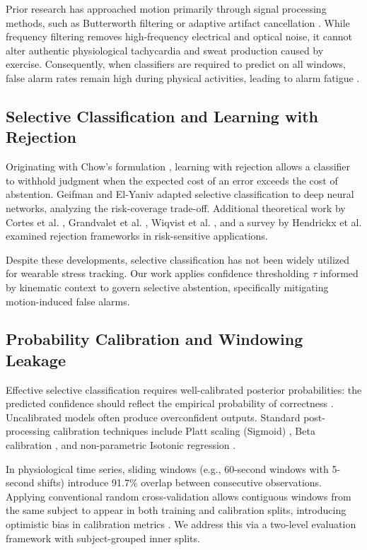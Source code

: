 \documentclass[conference]{IEEEtran}
\begin{document}
Prior research has approached motion primarily through signal processing methods, such as Butterworth filtering or adaptive artifact cancellation \cite{zhang2014troika}. While frequency filtering removes high-frequency electrical and optical noise, it cannot alter authentic physiological tachycardia and sweat production caused by exercise. Consequently, when classifiers are required to predict on all windows, false alarm rates remain high during physical activities, leading to alarm fatigue \cite{can2019stress}.

\subsection{Selective Classification and Learning with Rejection}
Originating with Chow's formulation \cite{chow1970optimum}, learning with rejection allows a classifier to withhold judgment when the expected cost of an error exceeds the cost of abstention. Geifman and El-Yaniv \cite{geifman2017selective, geifman2019selectivenet} adapted selective classification to deep neural networks, analyzing the risk-coverage trade-off. Additional theoretical work by Cortes et al. \cite{cortes2016learning}, Grandvalet et al. \cite{grandvalet2002adaptive}, Wiqvist et al. \cite{wiqvist2022partially}, and a survey by Hendrickx et al. \cite{hendrickx2021machine} examined rejection frameworks in risk-sensitive applications.

Despite these developments, selective classification has not been widely utilized for wearable stress tracking. Our work applies confidence thresholding $\tau$ informed by kinematic context to govern selective abstention, specifically mitigating motion-induced false alarms.

\subsection{Probability Calibration and Windowing Leakage}
Effective selective classification requires well-calibrated posterior probabilities: the predicted confidence should reflect the empirical probability of correctness \cite{guo2017calibration}. Uncalibrated models often produce overconfident outputs. Standard post-processing calibration techniques include Platt scaling (Sigmoid) \cite{platt1999probabilistic}, Beta calibration \cite{kull2017beta}, and non-parametric Isotonic regression \cite{zadrozny2002transforming, niculescu2005predicting}.

In physiological time series, sliding windows (e.g., 60-second windows with 5-second shifts) introduce 91.7\% overlap between consecutive observations. Applying conventional random cross-validation allows contiguous windows from the same subject to appear in both training and calibration splits, introducing optimistic bias in calibration metrics \cite{saeb2017need, little2019using}. We address this via a two-level evaluation framework with subject-grouped inner splits.
\end{document}
